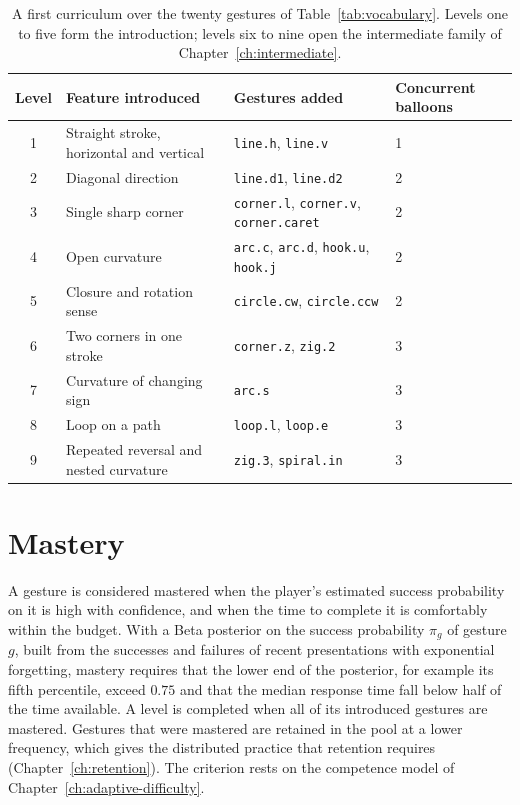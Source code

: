 \begin{table}[t]
\centering
\small
\begin{tabularx}{\textwidth}{@{}clXl@{}}
\toprule
Level & Feature introduced & Gestures added & Concurrent balloons \\
\midrule
1 & Straight stroke, horizontal and vertical & \texttt{line.h}, \texttt{line.v} & 1 \\
2 & Diagonal direction & \texttt{line.d1}, \texttt{line.d2} & 2 \\
3 & Single sharp corner & \texttt{corner.l}, \texttt{corner.v}, \texttt{corner.caret} & 2 \\
4 & Open curvature & \texttt{arc.c}, \texttt{arc.d}, \texttt{hook.u}, \texttt{hook.j} & 2 \\
5 & Closure and rotation sense & \texttt{circle.cw}, \texttt{circle.ccw} & 2 \\
6 & Two corners in one stroke & \texttt{corner.z}, \texttt{zig.2} & 3 \\
7 & Curvature of changing sign & \texttt{arc.s} & 3 \\
8 & Loop on a path & \texttt{loop.l}, \texttt{loop.e} & 3 \\
9 & Repeated reversal and nested curvature & \texttt{zig.3}, \texttt{spiral.in} & 3 \\
\bottomrule
\end{tabularx}
\caption{A first curriculum over the twenty gestures of Table~\ref{tab:vocabulary}. Levels one to five form the introduction; levels six to nine open the intermediate family of Chapter~\ref{ch:intermediate}.}
\label{tab:curriculum}
\end{table}

\section{Mastery}

A gesture is considered mastered when the player's estimated success probability on it is high with confidence, and when the time to complete it is comfortably within the budget. With a Beta posterior on the success probability $\pi_g$ of gesture $g$, built from the successes and failures of recent presentations with exponential forgetting, mastery requires that the lower end of the posterior, for example its fifth percentile, exceed $0.75$ and that the median response time fall below half of the time available. A level is completed when all of its introduced gestures are mastered. Gestures that were mastered are retained in the pool at a lower frequency, which gives the distributed practice that retention requires (Chapter~\ref{ch:retention}). The criterion rests on the competence model of Chapter~\ref{ch:adaptive-difficulty}.

